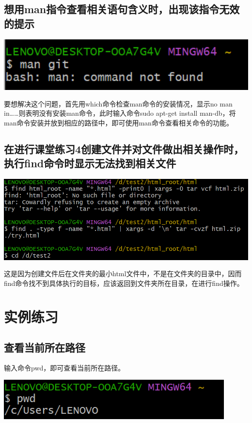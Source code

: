 \documentclass[UTF8,a4paper]{ctexart}
\begin{document}
\begin{sloppypar}
	\subsection{想用man指令查看相关语句含义时，出现该指令无效的提示}

	\includegraphics[width = 16cm]{14}

	要想解决这个问题，首先用which命令检查man命令的安装情况，显示no man in……则表明没有安装man命令，此时输入命令sudo apt-get install man-db，将man命令安装并放到相应的路径中，即可使用man命令查看相关命令的功能。
	\subsection{在进行课堂练习4创建文件并对文件做出相关操作时，执行find命令时显示无法找到相关文件}
	
	\includegraphics[width = 16cm]{15}

	这是因为创建文件后在文件夹的最小html文件中，不是在文件夹的目录中，因而find命令找不到具体执行的目标，应该返回到文件夹所在目录，在进行find操作。
	
	\section{实例练习}
	\subsection{查看当前所在路径}
	输入命令pwd，即可查看当前所在路径。

	\includegraphics[width = 12cm]{16}
	

\end{sloppypar}
\end{document}
